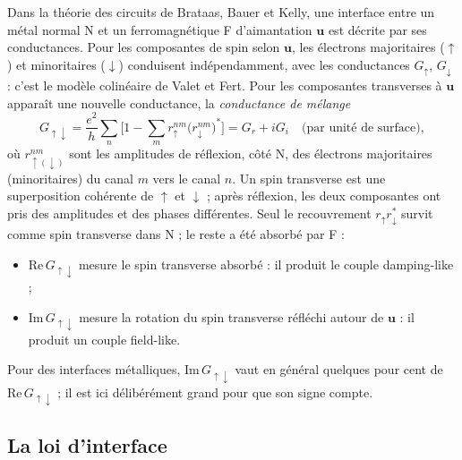 \documentclass[11pt,a4paper]{article}
\newcommand{\vu}{\bm{u}}
\begin{document}
Dans la théorie des circuits de Brataas, Bauer et Kelly, une interface
entre un métal normal N et un ferromagnétique F d'aimantation $\vu$ est
décrite par ses conductances. Pour les composantes de spin selon $\vu$,
les électrons majoritaires ($\uparrow$) et minoritaires ($\downarrow$)
conduisent indépendamment, avec les conductances $G_\uparrow$,
$G_\downarrow$ : c'est le modèle colinéaire de Valet et Fert. Pour les
composantes transverses à $\vu$ apparaît une nouvelle conductance, la
\emph{conductance de mélange}
\begin{equation}
  G_{\uparrow\downarrow} = \frac{e^2}{h}\sum_{n}\Big[1 - \sum_m
    r_\uparrow^{nm}\big(r_\downarrow^{nm}\big)^*\Big]
  = G_r + iG_i \quad\text{(par unité de surface)},
\end{equation}
où $r_{\uparrow(\downarrow)}^{nm}$ sont les amplitudes de réflexion, côté
N, des électrons majoritaires (minoritaires) du canal $m$ vers le canal
$n$. Un spin transverse est une superposition cohérente de $\uparrow$ et
$\downarrow$ ; après réflexion, les deux composantes ont pris des
amplitudes et des phases différentes. Seul le recouvrement $r_\uparrow
r_\downarrow^*$ survit comme spin transverse dans N ; le reste a été
absorbé par F :
\begin{itemize}
  \item $\mathrm{Re}\,G_{\uparrow\downarrow}$ mesure le spin transverse
    absorbé : il produit le couple damping-like ;
  \item $\mathrm{Im}\,G_{\uparrow\downarrow}$ mesure la rotation du spin
    transverse réfléchi autour de $\vu$ : il produit un couple field-like.
\end{itemize}
Pour des interfaces métalliques, $\mathrm{Im}\,G_{\uparrow\downarrow}$ vaut
en général quelques pour cent de $\mathrm{Re}\,G_{\uparrow\downarrow}$ ;
il est ici délibérément grand pour que son signe compte.

\subsection{La loi d'interface}
\end{document}
